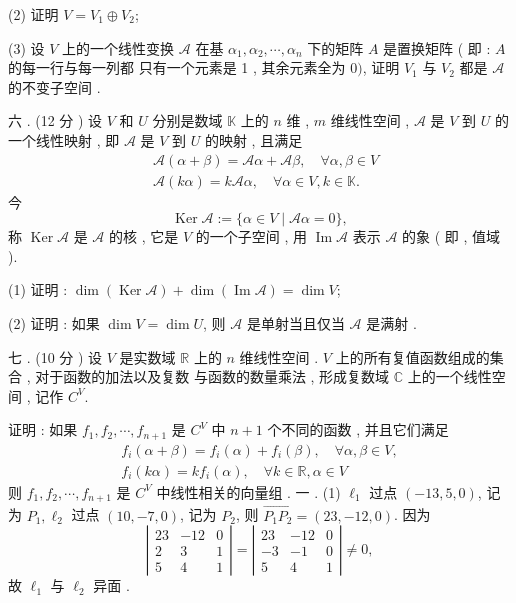 \documentclass[10pt]{article}
\begin{document}
(2)  证明  $V=V_{1} \oplus V_{2}$;

(3)  设  $V$  上的一个线性变换  $\mathscr{A}$  在基  $\alpha_{1}, \alpha_{2}, \cdots, \alpha_{n}$  下的矩阵  $A$  是置换矩阵  ( 即 : $A$  的每一行与每一列都   只有一个元素是  1 ,  其余元素全为  0$)$,  证明  $V_{1}$  与  $V_{2}$  都是  $\mathscr{A}$  的不变子空间 .

 六 . (12  分 )  设  $V$  和  $U$  分别是数域  $\mathbb{K}$  上的  $n$  维 , $m$  维线性空间 , $\mathscr{A}$  是  $V$  到  $U$  的一个线性映射 ,  即  $\mathscr{A}$  是  $V$  到  $U$  的映射 ,  且满足 
$$
\begin{aligned}
&\mathscr{A}(\alpha+\beta)=\mathscr{A} \alpha+\mathscr{A} \beta, \quad \forall \alpha, \beta \in V \\
&\mathscr{A}(k \alpha)=k \mathscr{A} \alpha, \quad \forall \alpha \in V, k \in \mathbb{K} .
\end{aligned}
$$
 今 
$$
\operatorname{Ker} \mathscr{A}:=\{\alpha \in V \mid \mathscr{A} \alpha=0\},
$$
 称  $\operatorname{Ker} \mathscr{A}$  是  $\mathscr{A}$  的核 ,  它是  $V$  的一个子空间 ,  用  $\operatorname{Im} \mathscr{A}$  表示  $\mathscr{A}$  的象  ( 即 ,  值域 ).

(1)  证明 : $\operatorname{dim}(\operatorname{Ker} \mathscr{A})+\operatorname{dim}(\operatorname{Im} \mathscr{A})=\operatorname{dim} V$;

(2)  证明 :  如果  $\operatorname{dim} V=\operatorname{dim} U$,  则  $\mathscr{A}$  是单射当且仅当  $\mathscr{A}$  是满射 .

 七 . (10  分 )  设  $V$  是实数域  $\mathbb{R}$  上的  $n$  维线性空间 . $V$  上的所有复值函数组成的集合 ,  对于函数的加法以及复数   与函数的数量乘法 ,  形成复数域  $\mathbb{C}$  上的一个线性空间 ,  记作  $C^{V}$.

 证明 :  如果  $f_{1}, f_{2}, \cdots, f_{n+1}$  是  $C^{V}$  中  $n+1$  个不同的函数 ,  并且它们满足 
$$
\begin{gathered}
f_{i}(\alpha+\beta)=f_{i}(\alpha)+f_{i}(\beta), \quad \forall \alpha, \beta \in V, \\
f_{i}(k \alpha)=k f_{i}(\alpha), \quad \forall k \in \mathbb{R}, \alpha \in V
\end{gathered}
$$
 则  $f_{1}, f_{2}, \cdots, f_{n+1}$  是  $C^{V}$  中线性相关的向量组 .  一 . (1) $\ell_{1}$  过点  $(-13,5,0)$,  记为  $P_{1}, \ell_{2}$  过点  $(10,-7,0)$,  记为  $P_{2}$,  则  $\overrightarrow{P_{1} P_{2}}=(23,-12,0)$.  因为 
$$
\left|\begin{array}{ccc}
23 & -12 & 0 \\
2 & 3 & 1 \\
5 & 4 & 1
\end{array}\right|=\left|\begin{array}{ccc}
23 & -12 & 0 \\
-3 & -1 & 0 \\
5 & 4 & 1
\end{array}\right| \neq 0,
$$
 故  $\ell_{1}$  与  $\ell_{2}$  异面 .
\end{document}
